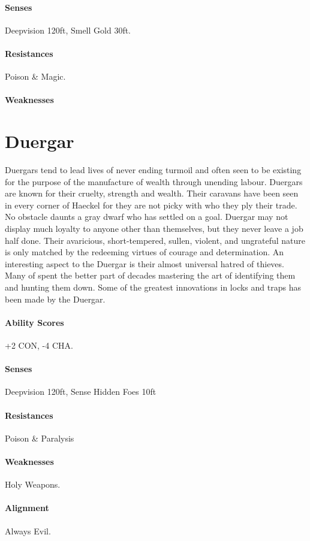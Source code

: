 \begin{multicols}{2}
    \paragraph{Senses} Deepvision 120ft, Smell Gold 30ft. 
    \paragraph{Resistances} Poison \& Magic.  
    \paragraph{Weaknesses} 
    
\section{Duergar}
    Duergars tend to lead lives of never ending turmoil and often seen to be existing for the purpose of the manufacture of wealth through unending labour. Duergars are known for their cruelty, strength and wealth. Their caravans have been seen in every corner of Haeckel for they are not picky with who they ply their trade. No obstacle daunts a gray dwarf who has settled on a goal. Duergar may not display much loyalty to anyone other than themselves, but they never leave a job half done. Their avaricious, short-tempered, sullen, violent, and ungrateful nature is only matched by the redeeming virtues of courage and determination. An interesting aspect to the Duergar is their almost universal hatred of thieves. Many of spent the better part of decades mastering the art of identifying them and hunting them down. Some of the greatest innovations in locks and traps has been made by the Duergar. 
    
    \paragraph{Ability Scores} +2 CON, -4 CHA.
    \paragraph{Senses} Deepvision 120ft, Sense Hidden Foes 10ft
    \paragraph{Resistances} Poison \& Paralysis
    \paragraph{Weaknesses} Holy Weapons. 
    \paragraph{Alignment} Always Evil. 
    

\end{multicols}    

